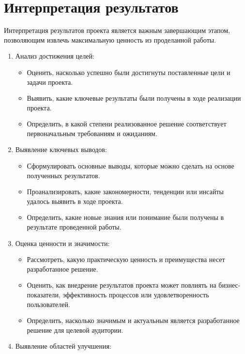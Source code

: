     \section{Интерпретация результатов}
    Интерпретация результатов проекта является важным завершающим этапом, позволяющим извлечь максимальную ценность из проделанной работы.
    \begin{enumerate}
        \item Анализ достижения целей:
            \begin{itemize}
                \item Оценить, насколько успешно были достигнуты поставленные цели и задачи проекта.
                \item Выявить, какие ключевые результаты были получены в ходе реализации проекта.
                \item Определить, в какой степени реализованное решение соответствует первоначальным требованиям и ожиданиям.
            \end{itemize}
        \item Выявление ключевых выводов:
            \begin{itemize}
                \item Сформулировать основные выводы, которые можно сделать на основе полученных результатов.
                \item Проанализировать, какие закономерности, тенденции или инсайты удалось выявить в ходе проекта.
                \item Определить, какие новые знания или понимание были получены в результате проведенной работы.
            \end{itemize}
        \item Оценка ценности и значимости:
            \begin{itemize}
                \item Рассмотреть, какую практическую ценность и преимущества несет разработанное решение.
                \item Оценить, как внедрение результатов проекта может повлиять на бизнес-показатели, эффективность процессов или удовлетворенность пользователей.
                \item Определить, насколько значимым и актуальным является разработанное решение для целевой аудитории.
            \end{itemize}
        \item Выявление областей улучшения:
            \begin{itemize}

\end{itemize}
\end{enumerate}
